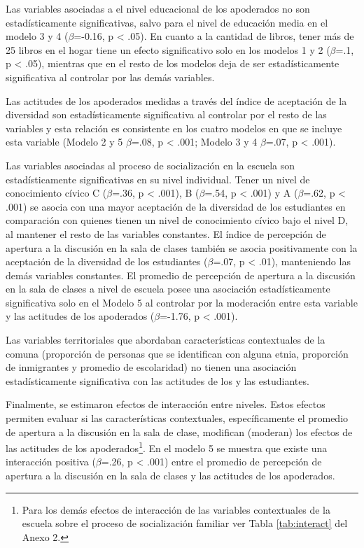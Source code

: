 \documentclass[12pt,twoside]{templates/facsothesis}
\begin{document}
Las variables asociadas a el nivel educacional de los apoderados no son estadísticamente significativas, salvo para el nivel de educación media en el modelo 3 y 4 (\(\beta\)=-0.16, p \textless{} .05). En cuanto a la cantidad de libros, tener más de 25 libros en el hogar tiene un efecto significativo solo en los modelos 1 y 2 (\(\beta\)=.1, p \textless{} .05), mientras que en el resto de los modelos deja de ser estadísticamente significativa al controlar por las demás variables.

Las actitudes de los apoderados medidas a través del índice de aceptación de la diversidad son estadísticamente significativa al controlar por el resto de las variables y esta relación es consistente en los cuatro modelos en que se incluye esta variable (Modelo 2 y 5 \(\beta\)=.08, p \textless{} .001; Modelo 3 y 4 \(\beta\)=.07, p \textless{} .001).

Las variables asociadas al proceso de socialización en la escuela son estadísticamente significativas en su nivel individual. Tener un nivel de conocimiento cívico C (\(\beta\)=.36, p \textless{} .001), B (\(\beta\)=.54, p \textless{} .001) y A (\(\beta\)=.62, p \textless{} .001) se asocia con una mayor aceptación de la diversidad de los estudiantes en comparación con quienes tienen un nivel de conocimiento cívico bajo el nivel D, al mantener el resto de las variables constantes. El índice de percepción de apertura a la discusión en la sala de clases también se asocia positivamente con la aceptación de la diversidad de los estudiantes (\(\beta\)=.07, p \textless{} .01), manteniendo las demás variables constantes. El promedio de percepción de apertura a la discusión en la sala de clases a nivel de escuela posee una asociación estadísticamente significativa solo en el Modelo 5 al controlar por la moderación entre esta variable y las actitudes de los apoderados (\(\beta\)=-1.76, p \textless{} .001).

Las variables territoriales que abordaban características contextuales de la comuna (proporción de personas que se identifican con alguna etnia, proporción de inmigrantes y promedio de escolaridad) no tienen una asociación estadísticamente significativa con las actitudes de los y las estudiantes.

Finalmente, se estimaron efectos de interacción entre niveles. Estos efectos permiten evaluar si las características contextuales, específicamente el promedio de apertura a la discusión en la sala de clase, modifican (moderan) los efectos de las actitudes de los apoderados\footnote{Para los demás efectos de interacción de las variables contextuales de la escuela sobre el proceso de socialización familiar ver Tabla \ref{tab:interact} del Anexo 2.}. En el modelo 5 se muestra que existe una interacción positiva (\(\beta\)=.26, p \textless{} .001) entre el promedio de percepción de apertura a la discusión en la sala de clases y las actitudes de los apoderados.
\end{document}
